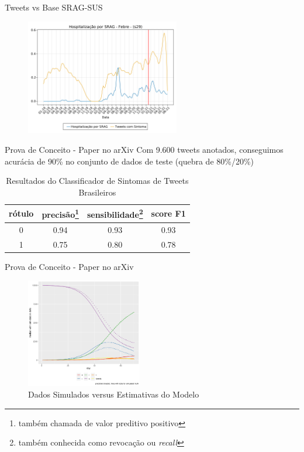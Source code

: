 \documentclass[aspectratio=169]{beamer}                    %
\begin{document}
\begin{frame}{Tweets vs Base SRAG-SUS}
    \begin{figure}
        \centering
        \includegraphics[width=0.6\textwidth]{srag_twitter_s29_int.png}
        \label{fig:srag_twitter_s29_int}
    \end{figure}
\end{frame}

\begin{frame}{Prova de Conceito - Paper no arXiv \parencite{storopoliSimulationDrivenCOVID19Epidemiological2021a}}
    Com 9.600 tweets anotados, conseguimos acurácia de 90\% no conjunto de dados de teste (quebra de 80\%/20\%)
    \vfill
    \begin{table}
        \centering
        \begin{tabular}{|c | c c c|}
            \hline
            rótulo & precisão\footnote{também chamada de valor preditivo positivo} & sensibilidade\footnote{também conhecida como revocação ou \textit{recall}} & score F1 \\
            \hline
            0 & 0.94 & 0.93 & 0.93 \\
            1 & 0.75 & 0.80 & 0.78 \\
            \hline
        \end{tabular}
        \label{tab:result_arXiv_classifier}
        \caption{Resultados do Classificador de Sintomas de Tweets Brasileiros}
    \end{table}
\end{frame}

\begin{frame}{Prova de Conceito - Paper no arXiv \parencite{storopoliSimulationDrivenCOVID19Epidemiological2021a}}
    \begin{figure}
        \centering
        \includegraphics[width=0.45\textwidth]{fit_simulated.png}
        \caption{Dados Simulados versus Estimativas do Modelo}
        \label{fig:fit_simulated}
    \end{figure}
\end{frame}
\end{document}
